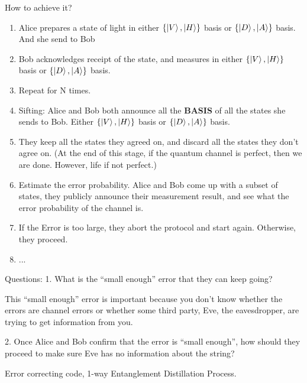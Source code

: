 \documentclass[%
 reprint,
superscriptaddress,
 amsmath,amssymb,
 aps,
]{revtex4-2}
\begin{document}
How to achieve it? 
\begin{enumerate}
    \item Alice prepares a state of light in either $\{\ket{V}, \ket{H}\}$ basis or $\{\ket{D}, \ket{A}\}$ basis. And she send to Bob

    \item Bob acknowledges receipt of the state, and measures in either $\{\ket{V}, \ket{H}\}$ basis or $\{\ket{D}, \ket{A}\}$ basis.

    \item Repeat for N times.

    \item Sifting: Alice and Bob both announce all the \textbf{BASIS} of all the states she sends to Bob. Either $\{\ket{V}, \ket{H}\}$ basis or $\{\ket{D}, \ket{A}\}$ basis.

    \item They keep all the states they agreed on, and discard all the states they don't agree on. (At the end of this stage, if the quantum channel is perfect, then we are done. However, life if not perfect.)

    \item Estimate the error probability. Alice and Bob come up with a subset of states, they publicly announce their measurement result, and see what the error probability of the channel is.

    \item If the Error is too large, they abort the protocol and start again. Otherwise, they proceed.

    \item ...
\end{enumerate}

Questions:
1. What is the ``small enough'' error that they can keep going?

This ``small enough'' error is important because you don't know whether the errors are channel errors or whether some third party, Eve, the eavesdropper, are trying to get information from you.

2. Once Alice and Bob confirm that the error is ``small enough'', how should they proceed to make sure Eve has no information about the string?

Error correcting code, 1-way Entanglement Distillation Process.


\end{document}
